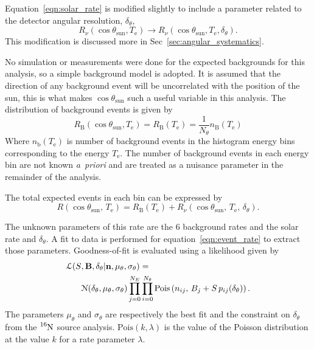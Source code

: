 Equation~\eqref{eqn:solar_rate} is modified slightly to include a parameter
related to the detector angular resolution, $\delta_{\theta}$,
\begin{equation}
R_{\nu}(\cos\theta_{\mathrm{sun}}, T_{\mathrm{e}}) \rightarrow
    R_{\nu}(\cos\theta_{\mathrm{sun}}, T_{\mathrm{e}}, \delta_{\theta})\text{.}
\end{equation}
This modification is discussed more in Sec~\ref{sec:angular_systematics}.

No simulation or measurements were done for the expected backgrounds for this analysis,
so a simple background model is adopted.
It is assumed that the direction of any background event will be uncorrelated
with the position of the sun, this is what makes $\cos\theta_{\mathrm{sun}}$ such a
useful variable in this analysis.
The distribution of background events is given by
\begin{equation}
    R_{\mathrm{B}}(\cos\theta_{\mathrm{sun}}, T_{\mathrm{e}}) =
    R_{\mathrm{B}}(T_{\mathrm{e}}) = \frac{1}{N_\theta}n_{\mathrm{B}}(T_{\mathrm{e}})
\end{equation}
Where $n_{\mathrm{b}}(T_{\mathrm{e}})$ is number of background events in the
histogram energy bins corresponding to the energy $T_{\mathrm{e}}$.
The number of background events in each energy bin are not known \textit{a~priori}
and are treated as a nuisance parameter in the remainder of the analysis.

The total expected events in each bin can be expressed by
\begin{equation}
    R(\cos\theta_{\mathrm{sun}}\text{, }T_{\mathrm{e}}) =
    R_{\mathrm{B}}(T_{\mathrm{e}}) + R_{\nu}(\cos\theta_{\mathrm{sun}}\text{, }T_{\mathrm{e}}\text{, }\delta_{\theta})\text{.}
    \label{eqn:event_rate}
\end{equation}

The unknown parameters of this rate are the 6 background rates and the solar
rate and $\delta_{\theta}$.
A fit to data is performed for equation~\eqref{eqn:event_rate} to extract
those parameters.
Goodness-of-fit is evaluated using a likelihood given by
\begin{align}
    \mathcal{L}(S&, \bold{B}, \delta_{\theta} | \bold{n}, \mu_{\theta}, \sigma_{\theta}) = \nonumber\\
    &\mathcal{N}(\delta_{\theta}, \mu_{\theta}, \sigma_\theta)
    \prod_{j=0}^{N_E}\prod^{N_{\theta}}_{i=0} \text{Pois}\left(n_{ij},\, B_{j} + S\,p_{ij}(\delta_{\theta})\right)\text{.}
    \label{eq:ll}
\end{align}
The parameters $\mu_{\theta}$ and $\sigma_{\theta}$ are respectively the best
fit and the constraint on $\delta_{\theta}$ from the $\ce{^{16}N}$ source
analysis.
$\text{Pois}\left(k, \lambda \right)$ is the value of the Poisson distribution
at the value $k$ for a rate parameter $\lambda$.

